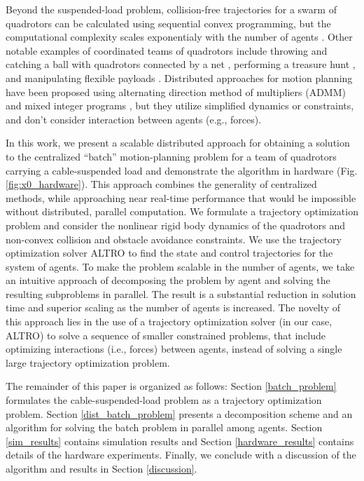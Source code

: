 \documentclass[../root.tex]{subfiles}
\begin{document}
Beyond the suspended-load problem, collision-free trajectories for a swarm of
quadrotors can be calculated using sequential convex programming, but the
computational complexity scales exponentialy with the number of agents
\cite{augugliaro_Generation_2012}. Other notable examples of coordinated teams
of quadrotors include throwing and catching a ball with quadrotors connected
by a net \cite{ritz_Cooperative_2012}, performing a treasure hunt
\cite{spurny_Cooperative_2019}, and manipulating flexible payloads
\cite{ritz_Carrying_2013}. Distributed approaches for motion planning have been
proposed using alternating direction method of multipliers (ADMM) and mixed
integer programs
\cite{vanparys_Online_2016,inalhan_Decentralized_2002,kuwata_Cooperative_2010,
park_Distributed_2019},
but they utilize simplified dynamics or constraints, and don't consider
interaction between agents (e.g., forces). 

In this work, we present a scalable distributed approach for obtaining
a solution to the centralized ``batch'' motion-planning
problem for a team of quadrotors carrying a cable-suspended load and
demonstrate the algorithm in hardware (Fig. \ref{fig:x0_hardware}).
This approach combines the generality of centralized methods, while
approaching near real-time performance that would be impossible without
distributed, parallel computation. We formulate a trajectory optimization
problem and consider the nonlinear rigid body
dynamics of the quadrotors and non-convex collision and obstacle
avoidance constraints. We use the trajectory
optimization solver ALTRO \cite{howell_ALTRO_2019} to find the state
and control trajectories for the system of agents. To make the problem
scalable in the number of agents, we take an intuitive approach of
decomposing the problem by agent and solving the resulting subproblems in
parallel. The result is a substantial
reduction in solution time and superior scaling as the number of agents is
increased. The novelty of this approach lies in the use of a
trajectory optimization solver (in our case, ALTRO) to solve a sequence of
smaller constrained problems, that include optimizing interactions (i.e.,
forces) between agents, instead of solving a single large trajectory
optimization problem.

The remainder of this paper is organized as follows:  Section \ref{batch_problem}
formulates the cable-suspended-load problem as a trajectory optimization
problem. Section \ref{dist_batch_problem} presents a decomposition scheme and
an algorithm for solving the batch problem in parallel among agents. Section
\ref{sim_results} contains simulation results and Section
\ref{hardware_results} contains details of the hardware experiments. Finally,
we conclude with a discussion of the algorithm and results in Section
\ref{discussion}.
\end{document}
